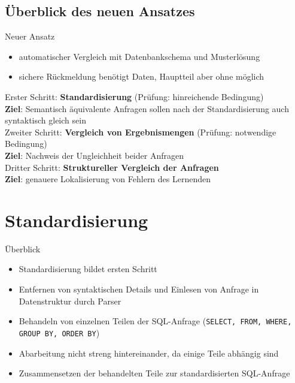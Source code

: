 \documentclass{beamer}
\begin{document}
\subsection{Überblick des neuen Ansatzes}

\begin{frame}{Neuer Ansatz}
\begin{itemize}
\item automatischer Vergleich mit Datenbankschema und Musterlösung
\item sichere Rückmeldung benötigt Daten, Hauptteil aber ohne möglich
\end{itemize}
\pause
Erster Schritt: \textbf{Standardisierung} (Prüfung: hinreichende Bedingung) \\
\textbf{Ziel}: Semantisch äquivalente Anfragen sollen nach der Standardisierung auch syntaktisch gleich sein \\
\vspace{4mm}\pause
Zweiter Schritt: \textbf{Vergleich von Ergebnismengen} (Prüfung: notwendige Bedingung)\\
\textbf{Ziel}: Nachweis der Ungleichheit beider Anfragen \\
\vspace{4mm}\pause
Dritter Schritt: \textbf{Struktureller Vergleich der Anfragen}\\
\textbf{Ziel}: genauere Lokalisierung von Fehlern des Lernenden
\end{frame}


\section{Standardisierung}

\begin{frame}[fragile]{Überblick}
\begin{itemize}
\item Standardisierung bildet ersten Schritt 
\item Entfernen von syntaktischen Details und Einlesen von Anfrage in Datenstruktur durch Parser
\item Behandeln von einzelnen Teilen der SQL-Anfrage (\verb|SELECT, FROM, WHERE, GROUP BY, ORDER BY|)
\item Abarbeitung nicht streng hintereinander, da einige Teile abhängig sind
\item Zusammensetzen der behandelten Teile zur standardisierten SQL-Anfrage
\end{itemize}
\end{frame}
\end{document}
